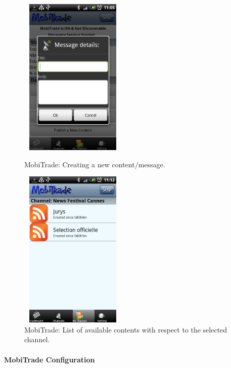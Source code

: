 \begin{figure}[!h]
\begin{minipage}[l]{0.3\linewidth}
\centering
\includegraphics[width=2in,height=3in]{Chapitre6/WriteMessage.png}
\begin{minipage}[l]{1\linewidth}
\small
\caption{MobiTrade: Creating a new content/message.}
\normalsize
\label{CreatingNewContent}
\end{minipage}
\end{minipage}
\hspace{2.1cm}
\begin{minipage}[l]{0.3\linewidth}
\centering
\includegraphics[width=2in,height=3in]{Chapitre6/ListContents.png}
\begin{minipage}[l]{1\linewidth}
\caption{MobiTrade: List of available contents with respect to the selected channel.}
\label{ListAvailableContents}
\end{minipage}
\end{minipage}
\end{figure}

\paragraph{MobiTrade Configuration}

